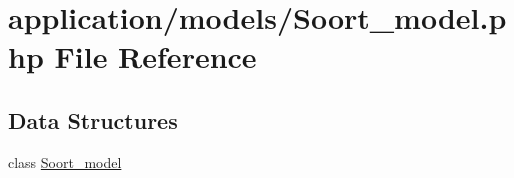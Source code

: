 \hypertarget{_soort__model_8php}{}\section{application/models/\+Soort\+\_\+model.php File Reference}
\label{_soort__model_8php}
\subsection*{Data Structures}
\begin{DoxyCompactItemize}
\item 
class \mbox{\hyperlink{class_soort__model}{Soort\+\_\+model}}
\end{DoxyCompactItemize}
